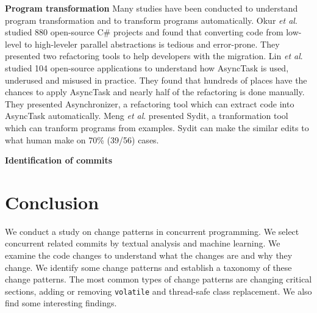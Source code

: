 \documentclass[conference]{IEEEtran}
\begin{document}
\textbf{Program transformation}
Many studies have been conducted to understand program transformation and to transform programs automatically. Okur \textit{et al}. \cite{conf/ecoop/OkurED14} studied 880 open-source C\# projects and found that converting code from low-level to high-leveler parallel abstractions is tedious and error-prone. They presented two refactoring tools to help developers with the migration. Lin \textit{et al}. \cite{conf/sigsoft/LinRD14} studied 104 open-source applications to understand how AsyncTask is used, underused and misused in practice. They found that hundreds of places have the chances to apply AsyncTask and nearly half of the refactoring is done manually. They presented Asynchronizer, a refactoring tool which can extract code into AsyncTask automatically. Meng \textit{et al}. \cite{conf/pldi/MengKM11} presented Sydit, a tranformation tool which can tranform programs from examples. Sydit can make the similar edits to what human make on 70\% (39/56) cases.

\textbf{Identification of commits}


\section{Conclusion}
We conduct a study on change patterns in concurrent programming. We select concurrent related commits by textual analysis and machine learning. We examine the code changes to understand what the changes are and why they change. We identify some change patterns and establish a taxonomy of these change patterns. The most common types of change patterns are changing critical sections, adding or removing \texttt{volatile} and thread-safe class replacement. We also find some interesting findings.


%
%
\end{document}

